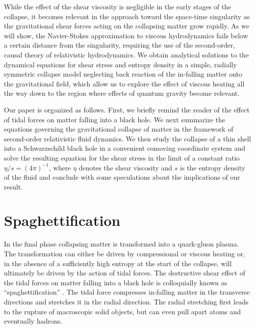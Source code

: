 \documentclass[article,twocolumn]{revtex4}
\begin{document}
While the effect of the shear viscosity is negligible in the early stages of the collapse, it becomes relevant in the approach toward the space-time singularity as the gravitational shear forces acting on the collapsing matter grow rapidly. As we will show, the Navier-Stokes approximation to viscous hydrodynamics fails below a certain distance from the singularity, requiring the use of the second-order, causal theory of relativistic hydrodynamics. We obtain analytical solutions to the dynamical equations for shear stress and entropy density in a simple, radially symmetric collapse model neglecting back reaction of the in-falling matter onto the gravitational field, which allow us to explore the effect of viscous heating all the way down to the region where effects of quantum gravity become relevant.

Our paper is organized as follows. First, we briefly remind the reader of the effect of tidal forces on matter falling into a black hole. We next summarize the equations governing the gravitational collapse of matter in the framework of second-order relativistic fluid dynamics. We then study the collapse of a thin shell into a Schwarzschild black hole in a convenient comoving coordinate system and solve the resulting equation for the shear stress in the limit of a constant ratio $\eta/s = (4\pi)^{-1}$, where $\eta$ denotes the shear viscosity and $s$ is the entropy density of the fluid and conclude with some speculations about the implications of our result. 

\section{Spaghettification}

In the final phase collapsing matter is transformed into a quark-gluon plasma. The transformation can either be driven by compressional or viscous heating or, in the absence of a sufficiently high entropy at the start of the collapse, will ultimately be driven by the action of tidal forces.  The destructive shear effect of the tidal forces on matter falling into a black hole is colloquially known as ``spaghettification'' \cite{Hawking:1988qt}. The tidal force compresses in-falling matter in the transverse directions and stretches it in the radial direction. The radial stretching first leads to the rupture of macroscopic solid objects, but can even pull apart atoms and eventually hadrons. 
\end{document}

